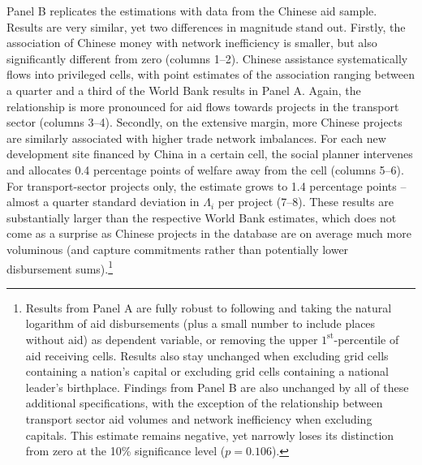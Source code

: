 \documentclass[11pt, oneside]{article}   	%
\begin{document}
Panel B replicates the estimations with data from the Chinese aid sample. Results are very similar, yet two differences in magnitude stand out. Firstly, the association of Chinese money with network inefficiency is smaller, but also significantly different from zero (columns 1--2). Chinese assistance systematically flows into privileged cells, with point estimates of the association ranging between a quarter and a third of the World Bank results in Panel A. Again, the relationship is more pronounced for aid flows towards projects in the transport sector (columns 3--4). Secondly, on the extensive margin, more Chinese projects are similarly associated with higher trade network imbalances. For each new development site financed by China in a certain cell, the social planner intervenes and allocates 0.4 percentage points of welfare away from the cell (columns 5--6). For transport-sector projects only, the estimate grows to 1.4 percentage points -- almost a quarter standard deviation in $\Lambda_{i}$ per project (7--8). These results are substantially larger than the respective World Bank estimates, which does not come as a surprise as Chinese projects in the database are on average much more voluminous (and capture commitments rather than potentially lower disbursement sums).\footnote{Results from Panel A are fully robust to following \cite{Dreher_Aidgrowthregional_2015} and taking the natural logarithm of aid disbursements (plus a small number to include places without aid) as dependent variable, or removing the upper $1^{\textrm{st}}$-percentile of aid receiving cells. Results also stay unchanged when excluding grid cells containing a nation's capital or excluding grid cells containing a national leader's birthplace. Findings from Panel B are also unchanged by all of these additional specifications, with the exception of the relationship between transport sector aid volumes and network inefficiency when excluding capitals. This estimate remains negative, yet narrowly loses its distinction from zero at the 10\% significance level ($p = 0.106$).}
\end{document}
